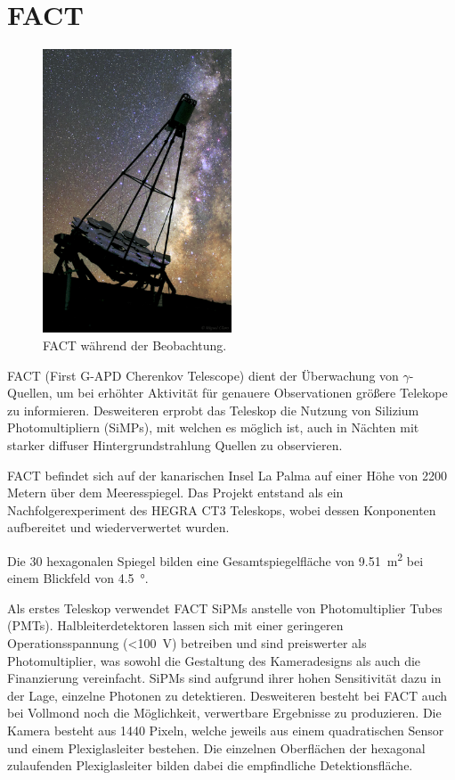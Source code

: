 \chapter{FACT}
\begin{figure}
  \includegraphics[width=0.50\textwidth]{./images/FACT.jpg}
  \caption{FACT während der Beobachtung.\cite{factpic}}
  \label{fig:observ}
\end{figure}
FACT (First G-APD Cherenkov Telescope) dient der Überwachung von $\gamma$-Quellen, um bei erhöhter Aktivität für genauere Observationen größere Telekope zu informieren. 
Desweiteren erprobt das Teleskop die Nutzung von Silizium Photomultipliern (SiMPs), mit welchen es möglich ist, auch in Nächten mit starker diffuser Hintergrundstrahlung Quellen zu observieren. 

FACT befindet sich auf der kanarischen Insel La Palma auf einer Höhe von 2200 Metern über dem Meeresspiegel.
Das Projekt entstand als ein Nachfolgerexperiment des HEGRA CT3 Teleskops, wobei dessen Konponenten aufbereitet und wiederverwertet wurden.

Die 30 hexagonalen Spiegel bilden eine Gesamtspiegelfläche von \SI{9.51}{\meter\squared} bei einem Blickfeld von \SI{4.5}{\degree}. 

Als erstes Teleskop verwendet FACT SiPMs anstelle von Photomultiplier Tubes (PMTs). 
Halbleiterdetektoren lassen sich mit einer geringeren Operationsspannung (\SI{<100}{\volt}) betreiben und sind preiswerter als Photomultiplier, was sowohl die Gestaltung des Kameradesigns als auch die Finanzierung vereinfacht. 
SiPMs sind aufgrund ihrer hohen Sensitivität dazu in der Lage, einzelne Photonen zu detektieren. 
Desweiteren besteht bei FACT auch bei Vollmond noch die Möglichkeit, verwertbare Ergebnisse zu produzieren.
Die Kamera besteht aus 1440 Pixeln, welche jeweils aus einem quadratischen Sensor und einem Plexiglasleiter bestehen. Die einzelnen Oberflächen der hexagonal zulaufenden Plexiglasleiter bilden dabei die empfindliche Detektionsfläche.

